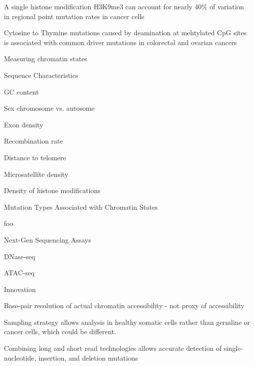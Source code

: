 \begin{outline}
\begin{outline}
\begin{outline}
			\item A single histone modification H3K9me3 can account for nearly 40\% of variation in regional point mutation rates in cancer cells \parencite{schuster-bockler_chromatin_2012}
			\item Cytosine to Thymine mutations caused by deamination at mehtylated CpG sites is associated with common driver mutations in colorectal and ovarian cancers \parencite{gold_somatic_2017}
		\end{outline}
		\item Measuring chromatin states
		\begin{outline}
			\item Sequence Characteristics \parencite{makova_effects_2015}
			\begin{outline}
				\item GC content
				\item Sex chromosome vs. autosome
				\item Exon density
				\item Recombination rate
				\item Distance to telomere
				\item Microsatellite density
				\item Density of histone modifications
			\end{outline}
			\item Mutation Types Associated with Chromatin States
			\begin{outline}
				\item foo
			\end{outline}
			\item Next-Gen Sequencing Assays
			\begin{outline}
				\item DNase-seq
				\item ATAC-seq
			\end{outline}
		\end{outline}
	\end{outline}
	\item Innovation
	\begin{outline}
		\item Base-pair resolution of actual chromatin accessibility - not proxy of accessibility
		\item Sampling strategy allows analysis in healthy somatic cells rather than germline or cancer cells, which could be different.
		\item Combining long and short read technologies allows accurate detection of single-nucleotide, insertion, and deletion mutations

\end{outline}
\end{outline}
